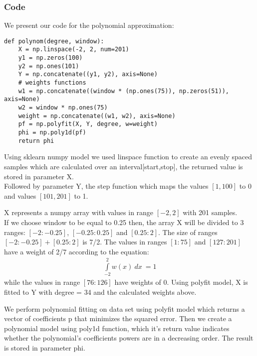 \documentclass{article}
\begin{document}
\subsubsection{Code}
We present our code for the polynomial approximation:\\
\begin{lstlisting}
def polynom(degree, window):
    X = np.linspace(-2, 2, num=201)
    y1 = np.zeros(100)
    y2 = np.ones(101)
    Y = np.concatenate((y1, y2), axis=None)
    # weights functions
    w1 = np.concatenate((window * (np.ones(75)), np.zeros(51)), axis=None)
    w2 = window * np.ones(75)
    weight = np.concatenate((w1, w2), axis=None)
    pf = np.polyfit(X, Y, degree, w=weight)
    phi = np.poly1d(pf)
    return phi
\end{lstlisting}
\par Using sklearn numpy model we used linspace function to create an evenly spaced samples which are calculated over an interval[start,stop], the returned value is stored in parameter X.\\
Followed by parameter Y, the step function which maps the values \([1,100]\) to 0 and values \([101,201]\) to 1.
\par X represents a numpy array with values in range \([-2,2]\) with 201 samples.\\
If we choose window to be equal to 0.25 then, the array X will be divided to 3 ranges: \([-2:-0.25]\), \([-0.25:0.25]\) and \([0.25:2]\). The size of ranges \([-2:-0.25] + [0.25:2]\) is 7/2. The values in ranges \([1:75]\) and \([127:201]\) have a weight of 2/7 according to the equation:
\begin{equation}
\begin{split}
\int\limits_{-2}^2  w(x) \ dx\ = 1 
\end{split}
\end{equation}
while the values in range \([76:126]\) have weights of 0.
Using polyfit model, X is fitted to Y with degree = 34 and the calculated weights above.
\par We perform polynomial fitting on data set using polyfit model which returns a vector of coefficients p that minimizes the squared error. Then we create a polynomial model using poly1d function, which it's return value indicates whether the polynomial's coefficients powers are in a decreasing order.
The result is stored in parameter phi.
\end{document}
